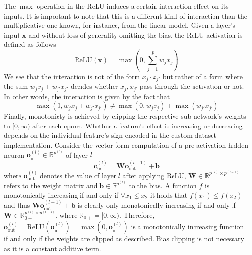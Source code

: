 \documentclass[twoside,11pt]{article}
\begin{document}
The $\max$-operation in the ReLU induces a certain interaction effect on its inputs. It is important to note that this is a different kind of interaction
than the multiplicative one known, for instance, from the linear model.
Given a layer's input $\boldsymbol{x}$ and without loss of generality omitting the bias, the ReLU activation is defined as follows
\begin{equation}
  \text{ReLU}(\boldsymbol{x})=\max(0,\sum_{j=1}^p w_j x_j)
  \label{eq-our-extension-interaction-1}
\end{equation}
We see that the interaction is not of the form $x_j \cdot x_{j'}$ but rather of a form where the sum $w_j x_j+w_{j'} x_{j'}$ decides whether $x_j,x_{j'}$
pass through the activation or not.
In other words, the interaction is given by the fact that
\begin{equation}
  \max(0,w_j x_j + w_{j'} x_{j'})\neq\max(0,w_j x_j)+\max(w_{j'} x_{j'})
  \label{eq-our-extension-interaction-2}
\end{equation}
Finally, monotonicty is achieved by clipping the respective sub-network's weights to $[0,\infty)$ after each epoch. Whether a feature's effect is
increasing or decreasing depends on the individual feature's sign encoded in the custom dataset implementation.
Consider the vector form computation of a pre-activation hidden neuron $\boldsymbol{o}_{\text{in}}^{(l)}\in\mathbb{R}^{p^{(l)}}$ of layer $l$
\begin{equation}
  \boldsymbol{o}_{\text{in}}^{(l)}=\boldsymbol{W} \boldsymbol{o}_{\text{out}}^{(l-1)} + \boldsymbol{b}
  \label{eq-our-extension-monotonicity}
\end{equation}
where $\boldsymbol{o}_{\text{out}}^{(l)}$ denotes the value of layer $l$ after applying ReLU, $\boldsymbol{W}\in\mathbb{R}^{p^{(l)} \times p^{(l-1)}}$ refers to
the weight matrix and $\boldsymbol{b}\in\mathbb{R}^{p^{(l)}}$ to the bias.
A function $f$ is monotonically increasing if and only if $\forall x_1\le x_2$ it holds that $f(x_1)\le f(x_2)$ and thus
$\boldsymbol{W} \boldsymbol{o}_{\text{out}}^{(l-1)} + \boldsymbol{b}$ is clearly only monotonically increasing if and only if
$\boldsymbol{W}\in\mathbb{R}_{0+}^{p^{(l)}\times p^{(l-1)}}$, where $\mathbb{R}_{0+}=[0,\infty)$.
Therefore, $\boldsymbol{o}_{\text{out}}^{(l)}=\text{ReLU}(\boldsymbol{o}_{\text{in}}^{(l)})=\max(0,\boldsymbol{o}_{\text{in}}^{(l)})$ is a monotonically increasing
function if and only if the weights are clipped as described. Bias clipping is not necessary as it is a constant additive term.
\end{document}
